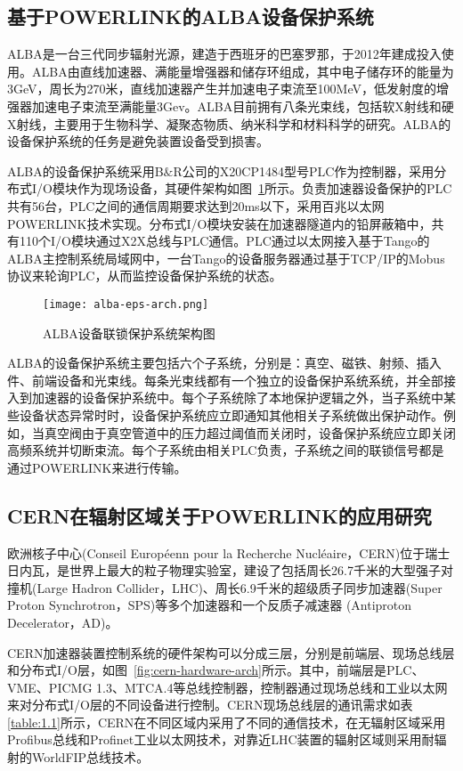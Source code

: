 \subsection{基于POWERLINK的ALBA设备保护系统}
ALBA是一台三代同步辐射光源，建造于西班牙的巴塞罗那，于2012年建成投入使用。ALBA由直线加速器、满能量增强器和储存环组成，其中电子储存环的能量为3GeV，周长为270米，直线加速器产生并加速电子束流至100MeV，低发射度的增强器加速电子束流至满能量3Gev。ALBA目前拥有八条光束线，包括软X射线和硬X射线，主要用于生物科学、凝聚态物质、纳米科学和材料科学的研究。ALBA的设备保护系统的任务是避免装置设备受到损害。

ALBA的设备保护系统采用B$\&$R公司的X20CP1484型号PLC作为控制器，采用分布式I/O模块作为现场设备，其硬件架构如图~\ref{fig:alba-eps-arch}所示。负责加速器设备保护的PLC共有56台，PLC之间的通信周期要求达到20ms以下，采用百兆以太网POWERLINK技术实现。分布式I/O模块安装在加速器隧道内的铅屏蔽箱中，共有110个I/O模块通过X2X总线与PLC通信\cite{Alba-eps}。PLC通过以太网接入基于Tango的ALBA主控制系统局域网中，一台Tango的设备服务器通过基于TCP/IP的Mobus协议来轮询PLC，从而监控设备保护系统的状态。

\begin{figure}[!htb]
	\centering
	\texttt{[image: alba-eps-arch.png]}
	\caption{ALBA设备联锁保护系统架构图}
	\label{fig:alba-eps-arch}
\end{figure}

ALBA的设备保护系统主要包括六个子系统，分别是：真空、磁铁、射频、插入件、前端设备和光束线。每条光束线都有一个独立的设备保护系统系统，并全部接入到加速器的设备保护系统中。每个子系统除了本地保护逻辑之外，当子系统中某些设备状态异常时时，设备保护系统应立即通知其他相关子系统做出保护动作。例如，当真空阀由于真空管道中的压力超过阈值而关闭时，设备保护系统应立即关闭高频系统并切断束流。每个子系统由相关PLC负责，子系统之间的联锁信号都是通过POWERLINK来进行传输。


\subsection{CERN在辐射区域关于POWERLINK的应用研究}
欧洲核子中心(Conseil Européenn pour la Recherche Nucléaire，CERN)位于瑞士日内瓦，是世界上最大的粒子物理实验室，建设了包括周长26.7千米的大型强子对撞机(Large Hadron Collider，LHC)、周长6.9千米的超级质子同步加速器(Super Proton Synchrotron，SPS)等多个加速器和一个反质子减速器 (Antiproton Decelerator，AD)。

CERN加速器装置控制系统的硬件架构可以分成三层，分别是前端层、现场总线层和分布式I/O层，如图~\ref{fig:cern-hardware-arch}所示。其中，前端层是PLC、VME、PICMG 1.3、MTCA.4等总线控制器，控制器通过现场总线和工业以太网来对分布式I/O层的不同设备进行控制。CERN现场总线层的通讯需求如表\ref{table:1.1}所示，CERN在不同区域内采用了不同的通信技术，在无辐射区域采用Profibus总线和Profinet工业以太网技术，对靠近LHC装置的辐射区域则采用耐辐射的WorldFIP总线技术\cite{Daniluk2017}。

